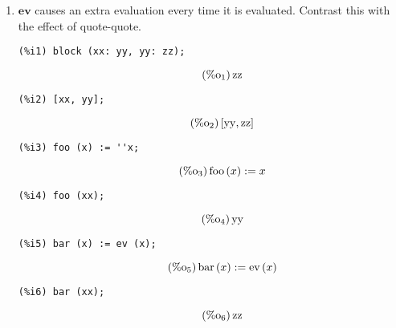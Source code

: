 \documentclass[12pt,leqno]{article}
\begin{document}
\begin{enumerate}
\item $\mathbf{ev}$ causes an extra evaluation every time it is evaluated.
Contrast this with the effect of quote-quote.
\begin{verbatim}
(%i1) block (xx: yy, yy: zz);
\end{verbatim}
\begin{equation}
\tag{$\mathop{\mathrm{\%o}_{1}}$}\mathop{\mathrm{zz}}
\label{eq:doc-group1-code18-1-1}
\end{equation}
\begin{verbatim}
(%i2) [xx, yy];
\end{verbatim}
\begin{equation}
\tag{$\mathop{\mathrm{\%o}_{2}}$}\left[\mathop{\mathrm{yy}}, \mathop{\mathrm{zz}}\right]
\label{eq:doc-group1-code18-2-1}
\end{equation}
\begin{verbatim}
(%i3) foo (x) := ''x;
\end{verbatim}
\begin{equation}
\tag{$\mathop{\mathrm{\%o}_{3}}$}\mathop{\mathrm{foo}}\left(x\right) := x
\label{eq:doc-group1-code18-3-1}
\end{equation}
\begin{verbatim}
(%i4) foo (xx);
\end{verbatim}
\begin{equation}
\tag{$\mathop{\mathrm{\%o}_{4}}$}\mathop{\mathrm{yy}}
\label{eq:doc-group1-code18-4-1}
\end{equation}
\begin{verbatim}
(%i5) bar (x) := ev (x);
\end{verbatim}
\begin{equation}
\tag{$\mathop{\mathrm{\%o}_{5}}$}\mathop{\mathrm{bar}}\left(x\right) := \mathop{\mathrm{ev}}\left(x\right)
\label{eq:doc-group1-code18-5-1}
\end{equation}
\begin{verbatim}
(%i6) bar (xx);
\end{verbatim}
\begin{equation}
\tag{$\mathop{\mathrm{\%o}_{6}}$}\mathop{\mathrm{zz}}
\label{eq:doc-group1-code18-6-1}
\end{equation}



\end{enumerate}
\end{document}
